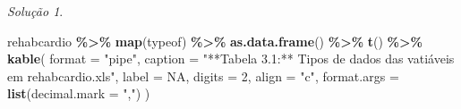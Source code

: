\documentclass[
]{latex/krantz}
\newenvironment{Shaded}{\begin{snugshade}}{\end{snugshade}}
\newcommand{\AttributeTok}[1]{\textcolor[rgb]{0.13,0.29,0.53}{#1}}
\newcommand{\ConstantTok}[1]{\textcolor[rgb]{0.56,0.35,0.01}{#1}}
\newcommand{\DecValTok}[1]{\textcolor[rgb]{0.00,0.00,0.81}{#1}}
\newcommand{\FunctionTok}[1]{\textcolor[rgb]{0.13,0.29,0.53}{\textbf{#1}}}
\newcommand{\NormalTok}[1]{#1}
\newcommand{\SpecialCharTok}[1]{\textcolor[rgb]{0.81,0.36,0.00}{\textbf{#1}}}
\newcommand{\StringTok}[1]{\textcolor[rgb]{0.31,0.60,0.02}{#1}}
\theoremstyle{definition}
\theoremstyle{definition}
\theoremstyle{definition}
\theoremstyle{definition}
\theoremstyle{remark}
\newtheorem*{solution}{Solução}
\begin{document}
\begin{solution}
\begin{Shaded}
\begin{Highlighting}[]
\NormalTok{rehabcardio }\SpecialCharTok{\%\textgreater{}\%}
  \FunctionTok{map}\NormalTok{(typeof) }\SpecialCharTok{\%\textgreater{}\%}
  \FunctionTok{as.data.frame}\NormalTok{() }\SpecialCharTok{\%\textgreater{}\%}
  \FunctionTok{t}\NormalTok{() }\SpecialCharTok{\%\textgreater{}\%}
  \FunctionTok{kable}\NormalTok{(}
    \AttributeTok{format =} \StringTok{"pipe"}\NormalTok{,}
    \AttributeTok{caption =} \StringTok{"**Tabela 3.1:** Tipos de dados das vatiáveis em \textasciigrave{}rehabcardio.xls\textasciigrave{}"}\NormalTok{,}
    \AttributeTok{label =} \ConstantTok{NA}\NormalTok{,}
    \AttributeTok{digits =} \DecValTok{2}\NormalTok{,}
    \AttributeTok{align =} \StringTok{"c"}\NormalTok{,}
    \AttributeTok{format.args =} \FunctionTok{list}\NormalTok{(}\AttributeTok{decimal.mark =} \StringTok{","}\NormalTok{)}
\NormalTok{  )}
\end{Highlighting}
\end{Shaded}


\end{solution}
\end{document}
